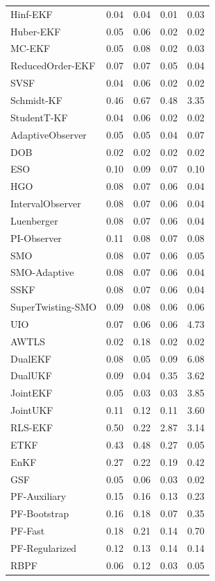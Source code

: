 \begin{longtable}{lrrrr}
Hinf-EKF & 0.04 & 0.04 & 0.01 & 0.03 \\
Huber-EKF & 0.05 & 0.06 & 0.02 & 0.02 \\
MC-EKF & 0.05 & 0.08 & 0.02 & 0.03 \\
ReducedOrder-EKF & 0.07 & 0.07 & 0.05 & 0.04 \\
SVSF & 0.04 & 0.06 & 0.02 & 0.02 \\
Schmidt-KF & 0.46 & 0.67 & 0.48 & 3.35 \\
StudentT-KF & 0.04 & 0.06 & 0.02 & 0.02 \\
AdaptiveObserver & 0.05 & 0.05 & 0.04 & 0.07 \\
DOB & 0.02 & 0.02 & 0.02 & 0.02 \\
ESO & 0.10 & 0.09 & 0.07 & 0.10 \\
HGO & 0.08 & 0.07 & 0.06 & 0.04 \\
IntervalObserver & 0.08 & 0.07 & 0.06 & 0.04 \\
Luenberger & 0.08 & 0.07 & 0.06 & 0.04 \\
PI-Observer & 0.11 & 0.08 & 0.07 & 0.08 \\
SMO & 0.08 & 0.07 & 0.06 & 0.05 \\
SMO-Adaptive & 0.08 & 0.07 & 0.06 & 0.04 \\
SSKF & 0.08 & 0.07 & 0.06 & 0.04 \\
SuperTwisting-SMO & 0.09 & 0.08 & 0.06 & 0.06 \\
UIO & 0.07 & 0.06 & 0.06 & 4.73 \\
AWTLS & 0.02 & 0.18 & 0.02 & 0.02 \\
DualEKF & 0.08 & 0.05 & 0.09 & 6.08 \\
DualUKF & 0.09 & 0.04 & 0.35 & 3.62 \\
JointEKF & 0.05 & 0.03 & 0.03 & 3.85 \\
JointUKF & 0.11 & 0.12 & 0.11 & 3.60 \\
RLS-EKF & 0.50 & 0.22 & 2.87 & 3.14 \\
ETKF & 0.43 & 0.48 & 0.27 & 0.05 \\
EnKF & 0.27 & 0.22 & 0.19 & 0.42 \\
GSF & 0.05 & 0.06 & 0.03 & 0.02 \\
PF-Auxiliary & 0.15 & 0.16 & 0.13 & 0.23 \\
PF-Bootstrap & 0.16 & 0.18 & 0.07 & 0.35 \\
PF-Fast & 0.18 & 0.21 & 0.14 & 0.70 \\
PF-Regularized & 0.12 & 0.13 & 0.14 & 0.14 \\
RBPF & 0.06 & 0.12 & 0.03 & 0.05 \\

\end{longtable}
